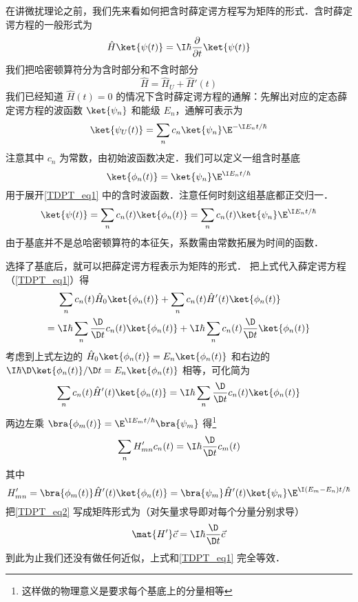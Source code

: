 
在讲微扰理论之前，我们先来看如何把含时薛定谔方程写为矩阵的形式．含时薛定谔方程的一般形式为
\begin{equation}\label{TDPT_eq1}
\hat H \ket{\psi(t)} = \I\hbar \frac{\partial}{\partial t} \ket{\psi(t)}
\end{equation}
我们把哈密顿算符分为含时部分和不含时部分
\begin{equation}
\hat H = \hat H_U + \hat H'(t)
\end{equation}
我们已经知道 %
$\hat H(t) = 0$ 的情况下含时薛定谔方程的通解：先解出对应的定态薛定谔方程的波函数 $\ket{\psi_n}$ 和能级 $E_n$，通解可表示为
\begin{equation}
\ket{\psi_U(t)} = \sum_n c_n \ket{\psi_n} \E^{-\I E_n t/\hbar}
\end{equation}
注意其中 $c_n$ 为常数，由初始波函数决定．我们可以定义一组含时基底
\begin{equation}
\ket{\phi_n(t)} = \ket{\psi_n} \E^{\I E_n t/\hbar}
\end{equation}
用于展开\autoref{TDPT_eq1} 中的含时波函数．注意任何时刻这组基底都正交归一．
\begin{equation}
\ket{\psi(t)} = \sum_n c_n(t) \ket{\phi_n(t)} = \sum_n c_n(t) \ket{\psi_n} \E^{\I E_n t/\hbar}
\end{equation}
由于基底并不是总哈密顿算符的本征矢，系数需由常数拓展为时间的函数．

选择了基底后，就可以把薛定谔方程表示为矩阵的形式． %
把上式代入薛定谔方程（\autoref{TDPT_eq1}）得
\begin{equation}\begin{aligned}
&\sum_n c_n(t)\hat H_0\ket{\phi_n(t)} + \sum_n c_n(t)\hat H'(t)\ket{\phi_n(t)} \\ 
={} &\I\hbar \sum_n \frac{\D}{\D t} c_n(t) \ket{\phi_n(t)}
+ \I\hbar \sum_n c_n(t) \frac{\D}{\D t} \ket{\phi_n(t)}
\end{aligned}\end{equation}
考虑到上式左边的 $\hat H_0\ket{\phi_n(t)} = E_n\ket{\phi_n(t)}$ 和右边的 $\I\hbar{\D} \ket{\phi_n(t)}/{\D t} = E_n\ket{\phi_n(t)}$ 相等，可化简为
\begin{equation}
\sum_n c_n(t)\hat H'(t)\ket{\phi_n(t)}
= \I\hbar \sum_n \frac{\D}{\D t} c_n(t) \ket{\phi_n(t)}
\end{equation}
两边左乘 $\bra{\phi_m(t)} = \E^{\I E_m t/\hbar}\bra{\psi_m}$ 得\footnote{这样做的物理意义是要求每个基底上的分量相等} %
\begin{equation}\label{TDPT_eq2}
\sum_n H'_{mn} c_n(t)
= \I\hbar\frac{\D}{\D t} c_m(t)
\end{equation}
其中
\begin{equation}\label{TDPT_eq7}
H'_{mn} = \bra{\phi_m(t)} \hat H'(t)\ket{\phi_n(t)} = \bra{\psi_m} \hat H'(t)\ket{\psi_n} \E^{\I(E_m-E_n)t/\hbar}
\end{equation}
把\autoref{TDPT_eq2} 写成矩阵形式为（对矢量求导即对每个分量分别求导）
\begin{equation}\label{TDPT_eq3}
\mat {H'} \vec c = \I\hbar \frac{\D}{\D t} \vec c
\end{equation}
到此为止我们还没有做任何近似，上式和\autoref{TDPT_eq1} 完全等效．

